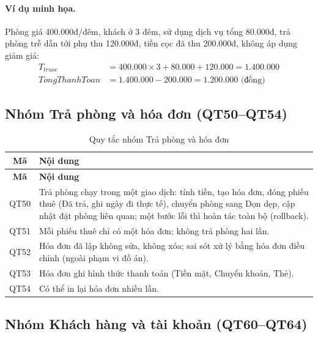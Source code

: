 \documentclass[14pt]{report}
\begin{document}
\paragraph{Ví dụ minh họa.} Phòng giá 400.000đ/đêm, khách ở 3 đêm, sử dụng dịch vụ tổng 80.000đ, trả phòng trễ dẫn tới phụ thu 120.000đ, tiền cọc đã thu 200.000đ, không áp dụng giảm giá:
\begin{align*}
T_{truoc} &= 400.000 \times 3 + 80.000 + 120.000 = 1.400.000 \\
TongThanhToan &= 1.400.000 - 200.000 = 1.200.000 \text{ (đồng)}
\end{align*}

\subsection{Nhóm Trả phòng và hóa đơn (QT50--QT54)}

\begin{longtable}{|c|p{12cm}|}
\caption{Quy tắc nhóm Trả phòng và hóa đơn}\\\hline
\textbf{Mã} & \textbf{Nội dung}\\\hline
\endfirsthead
\hline \textbf{Mã} & \textbf{Nội dung}\\\hline
\endhead
QT50 & Trả phòng chạy trong một giao dịch: tính tiền, tạo hóa đơn, đóng phiếu thuê (Đã trả, ghi ngày đi thực tế), chuyển phòng sang Dọn dẹp, cập nhật đặt phòng liên quan; một bước lỗi thì hoàn tác toàn bộ (rollback). \\\hline
QT51 & Mỗi phiếu thuê chỉ có một hóa đơn; không trả phòng hai lần. \\\hline
QT52 & Hóa đơn đã lập không sửa, không xóa; sai sót xử lý bằng hóa đơn điều chỉnh (ngoài phạm vi đồ án). \\\hline
QT53 & Hóa đơn ghi hình thức thanh toán (Tiền mặt, Chuyển khoản, Thẻ). \\\hline
QT54 & Có thể in lại hóa đơn nhiều lần. \\\hline
\end{longtable}

\subsection{Nhóm Khách hàng và tài khoản (QT60--QT64)}
\end{document}
